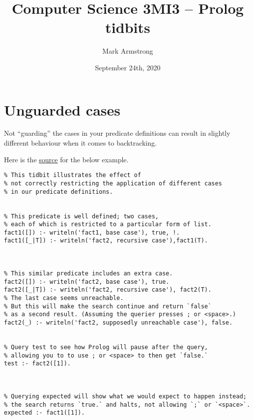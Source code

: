 \documentclass[11pt]{article}
\author{Mark Armstrong}
\date{September 24th, 2020}
\title{Computer Science 3MI3 – Prolog tidbits}
\begin{document}
\maketitle
\tableofcontents


\section*{Unguarded cases}
\label{sec:orge76a291}
Not “guarding” the cases in your predicate definitions
can result in slightly different behaviour when it comes to backtracking.

Here is the \href{./src/unguarded-cases.pl}{source} for the below example.

\begin{verbatim}
% This tidbit illustrates the effect of
% not correctly restricting the application of different cases
% in our predicate definitions.


% This predicate is well defined; two cases,
% each of which is restricted to a particular form of list.
fact1([]) :- writeln('fact1, base case'), true, !.
fact1([_|T]) :- writeln('fact2, recursive case'),fact1(T).



% This similar predicate includes an extra case.
fact2([]) :- writeln('fact2, base case'), true.
fact2([_|T]) :- writeln('fact2, recursive case'), fact2(T).
% The last case seems unreachable.
% But this will make the search continue and return `false`
% as a second result. (Assuming the querier presses ; or <space>.)
fact2(_) :- writeln('fact2, supposedly unreachable case'), false.


% Query test to see how Prolog will pause after the query,
% allowing you to to use ; or <space> to then get `false.`
test :- fact2([1]).



% Querying expected will show what we would expect to happen instead;
% the search returns `true.` and halts, not allowing `;` or `<space>`.
expected :- fact1([1]).
\end{verbatim}
\end{document}
